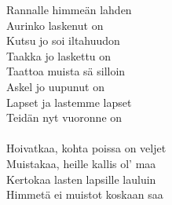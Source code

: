 
            Rannalle himmeän lahden \\
            Aurinko laskenut on \\
            Kutsu jo soi iltahuudon \\
            Taakka jo laskettu on \\
            Taattoa muista sä silloin \\
            Askel jo uupunut on \\
            Lapset ja lastemme lapset \\
            Teidän nyt vuoronne on \\
\hspace{10mm} \\
            Hoivatkaa, kohta poissa on veljet \\
            Muistakaa, heille kallis ol' maa \\
            Kertokaa lasten lapsille lauluin \\
            Himmetä ei muistot koskaan saa \\
